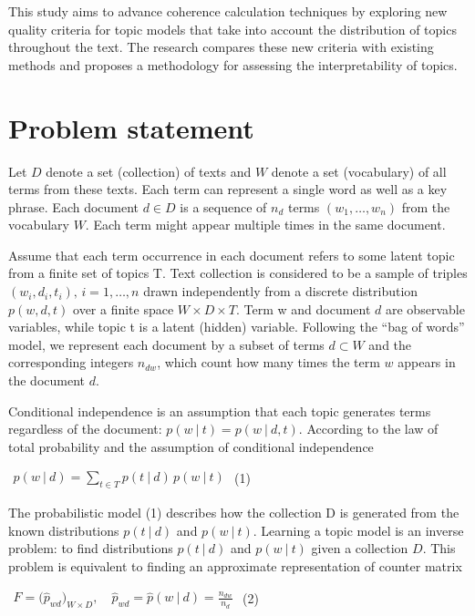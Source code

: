 \documentclass{article}
\begin{document}
This study aims to advance coherence calculation techniques by exploring new quality criteria for topic models that take into account the distribution of topics throughout the text. The research compares these new criteria with existing methods and proposes a methodology for assessing the interpretability of topics.

\section{Problem statement}

Let $D$ denote a set (collection) of texts and $W$ denote a set (vocabulary) of all terms from these texts. Each term can represent a single word as well as a key phrase. Each document $d \in D$ is a sequence of $n_d$ terms $(w_1, \dots, w_n)$ from the vocabulary $W$. Each term might appear multiple times in the same document.

Assume that each term occurrence in each document refers to some latent topic from a finite set of topics T. Text collection is considered to be a sample of triples $(w_i,d_i,t_i),\, {i=1,\ldots ,n} $ drawn independently from a discrete distribution $p(w,d,t)$ over a finite space $W\times D \times T$. Term w and document $d$ are observable variables, while topic t is a latent (hidden) variable. Following the “bag of words” model, we represent each document by a subset of terms $d\subset W$ and the corresponding integers $n_{dw}$, which count how many times the term $w$ appears in the document $d$.

Conditional independence is an assumption that each topic generates terms regardless of the document: $p(w\ {\vert }\ t) = p(w\ {\vert }\ d,t)$. According to the law of total probability and the assumption of conditional independence

$\begin{aligned} p(w\ {\vert }\ d) = \sum _{t\in T} p(t\ {\vert }\ d)\, p(w\ {\vert }\ t)\end{aligned}$ (1)

The probabilistic model (1) describes how the collection D is generated from the known distributions $p(t\ {\vert }\ d)$ and $p(w\ {\vert }\ t)$. Learning a topic model is an inverse problem: to find distributions $p(t\ {\vert }\ d)$ and $p(w\ {\vert }\ t)$ given a collection $D$. This problem is equivalent to finding an approximate representation of counter matrix

$\begin{aligned} F = \bigl ( \hat{p}_{wd} \bigr )_{W{\times }D}, \quad \hat{p}_{wd} = \hat{p}(w\ {\vert }\ d) = \tfrac{n_{dw}}{n_d}  \end{aligned}$ (2)
\end{document}
